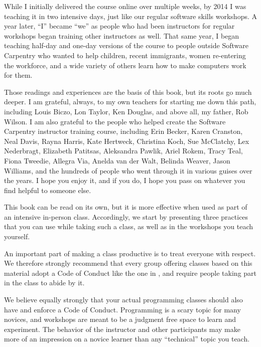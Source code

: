 While I initially delivered the course online over multiple weeks, by
2014 I was teaching it in two intensive days, just like our regular
software skills workshops.  A year later, ``I'' became ``we'' as
people who had been instructors for regular workshops began training
other instructors as well.  That same year, I began teaching half-day
and one-day versions of the course to people outside Software
Carpentry who wanted to help children, recent immigrants, women
re-entering the workforce, and a wide variety of others learn how to
make computers work for them.

Those readings and experiences are the basis of this book, but its
roots go much deeper.  I am grateful, always, to my own teachers for
starting me down this path, including Louis Biczo, Lon Taylor, Ken
Douglas, and above all, my father, Rob Wilson.  I am also grateful to
the people who helped create the Software Carpentry instructor
training course, including Erin Becker, Karen Cranston, Neal Davis,
Rayna Harris, Kate Hertweck, Christina Koch, Sue McClatchy, Lex
Nederbragt, Elizabeth Patitsas, Aleksandra Pawlik, Ariel Rokem, Tracy
Teal, Fiona Tweedie, Allegra Via, Anelda van der Walt, Belinda Weaver,
Jason Williams, and the hundreds of people who went through it in
various guises over the years.  I hope you enjoy it, and if you do, I
hope you pass on whatever you find helpful to someone else.


This book can be read on its own, but it is more effective when used
as part of an intensive in-person class.  Accordingly, we start by
presenting three practices that you can use while taking such a class,
as well as in the workshops you teach yourself.


An important part of making a class productive is to treat everyone
with respect.  We therefore strongly recommend that every group
offering classes based on this material adopt a Code of Conduct like
the one in , and require people taking part in the
class to abide by it.

We believe equally strongly that your actual programming classes
should also have and enforce a Code of Conduct.  Programming is a
scary topic for many novices, and workshops are meant to be a judgment
free space to learn and experiment. The behavior of the instructor and
other participants may make more of an impression on a novice learner
than any ``technical'' topic you teach.

